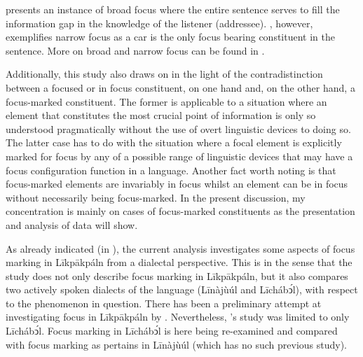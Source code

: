 \documentclass[output=paper,colorlinks,citecolor=brown]{langscibook}
\begin{document}
 presents an instance of broad focus where the entire sentence serves to fill the information gap in the knowledge of the listener (addressee). , however, exemplifies narrow focus as a car is the only focus bearing constituent in the sentence. More on broad and narrow focus can be found in \citet[96-97]{Hyman2010}.

Additionally, this study also draws on \citet[93]{VanPutten2016} in the light of the contradistinction between a focused or in focus constituent, on one hand and, on the other hand, a focus-marked constituent. The former is applicable to a situation where an element that constitutes the most crucial point of information is only so understood pragmatically without the use of overt linguistic devices to doing so. The latter case has to do with the situation where a focal element is explicitly marked for focus by any of a possible range of linguistic devices that may have a focus configuration function in a language. Another fact worth noting is that focus-marked elements are invariably in focus whilst an element can be in focus without necessarily being focus-marked. In the present discussion, my concentration is mainly on cases of focus-marked constituents as the presentation and analysis of data will show.

As already indicated (in ), the current analysis investigates some aspects of focus marking in Līkpākpáln from a dialectal perspective. This is in the sense that the study does not only describe focus marking in Līkpākpáln, but it also compares two actively spoken dialects of the language (Līnàjùúl and Līchábͻ́l), with respect to the phenomenon in question. There has been a preliminary attempt at investigating focus in Līkpākpáln by \citet{Schwarz2009}. Nevertheless, \citeauthor{Schwarz2009}’s study was limited to only Līchábͻ́l. Focus marking in Līchábͻ́l is here being re-examined and compared with focus marking as pertains in Līnàjùúl (which has no such previous study).
\end{document}
